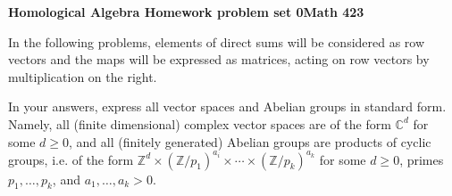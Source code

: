 \documentclass[12pt]{article}
\newcommand{\ZZ}{\mathbb{Z}}
\newcommand{\CC}{\mathbb{C}}
\begin{document}
\begin{center}{\Large
\vspace{2cm}

\bf  Homological Algebra Homework problem set 0\quad   Math 423\quad  \\
}
\vspace{.5in}

\end{center}

In the following problems, elements of direct sums will be considered
as row vectors and the maps will be expressed as matrices, acting on
row vectors by multiplication on the right. 

In your answers, express all vector spaces and Abelian groups in
standard form. Namely, all (finite dimensional) complex vector spaces
are of the form $\CC^{d}$ for some $d\geq 0$, and all (finitely generated)
Abelian groups are products of cyclic groups, i.e. of the form
$\ZZ^{d}\times (\ZZ/p_{1})^{a_{i}}\times \dotsb \times
(\ZZ/p_{k})^{a_{k}} $ for some $d\geq 0$, primes $p_{1},\dotsc
,p_{k}$, and $a_{1},\dotsc ,a_{k}> 0$.  
\end{document}
